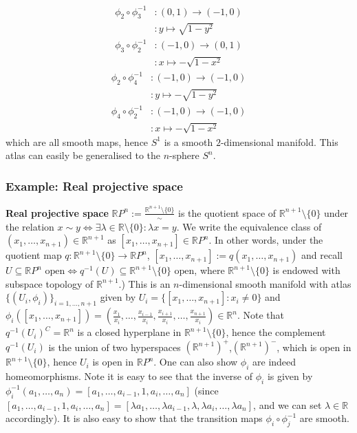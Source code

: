 \documentclass[a4paper]{article}
\theoremstyle{definition} \newtheorem*{definition}{Definition}
\theoremstyle{definition} \newtheorem*{definitions}{Definitions}
\theoremstyle{plain} \newtheorem{theorem}{Theorem}[section]
\theoremstyle{plain} \newtheorem{proposition}[theorem]{Proposition}
\theoremstyle{plain} \newtheorem{corollary}[theorem]{Corollary}
\theoremstyle{plain} \newtheorem{lemma}[theorem]{Lemma}
\theoremstyle{plain} \newtheorem{example}[theorem]{Example}
\newcommand{\defn}[1]{\textbf{#1}}
\newcommand{\realnos}{\mathbb{R}}
\begin{document}
\begin{align*}
\phi_2 \circ \phi_3^{-1} & : (0,1) \to (-1, 0) \\
& : y \mapsto \sqrt{1-y^2}
\end{align*}
\begin{align*}
\phi_3 \circ \phi_2^{-1} & : (-1,0) \to (0,1)\\
& : x \mapsto -\sqrt{1-x^2}
\end{align*}
\begin{align*}
\phi_2 \circ \phi_4^{-1} & : (-1,0) \to (-1,0)\\
& : y \mapsto -\sqrt{1-y^2}
\end{align*}
\begin{align*}
\phi_4 \circ \phi_2^{-1} & : (-1,0) \to (-1,0)\\
& : x \mapsto -\sqrt{1-x^2}
\end{align*}
which are all smooth maps, hence $S^1$ is a smooth $2$-dimensional manifold. This atlas can easily be generalised to the $n$-sphere $S^n$.

\subsubsection{Example: Real projective space}

\defn{Real projective space} $\realnos P^n := \frac{\realnos^{n+1}\setminus \{0\}}{\sim}$ is the quotient space of $\realnos^{n+1}\setminus \{0\}$ under the relation $x\sim y \iff \exists \lambda \in \realnos \setminus \{0\} : \lambda x=y$. We write the equivalence class of $(x_1, \ldots, x_{n+1})\in \realnos^{n+1}$ as $[x_1, \ldots, x_{n+1}]\in \realnos P^n$. 
In other words, under the quotient map $q:\realnos^{n+1}\setminus \{0\}\to \realnos P^n$, $[x_1, \ldots, x_{n+1}]:=q(x_1, \ldots, x_{n+1})$ and recall $U \subseteq \realnos P^n \textrm{ open} \iff q^{-1}(U) \subseteq \realnos^{n+1}\setminus \{0\} \textrm{ open}$, where $\realnos^{n+1}\setminus \{0\}$ is endowed with subspace topology of $\realnos^{n+1}$.) 
This is an $n$-dimensional smooth manifold with atlas $\{(U_i, \phi_i)\}_{i=1, \ldots, n+1}$ given by $U_i=\{[x_1, \ldots, x_{n+1}]: x_i\neq 0\}$ and $\phi_i([x_1, \ldots, x_{n+1}])=(\frac{x_1}{x_i}, \ldots , \frac{x_{i-1}}{x_i}, \frac{x_{i+1}}{x_i}, \ldots, \frac{x_{n+1}}{x_i})\in \realnos^n$. Note that $q^{-1}(U_i)^C=\realnos^n$ is a closed hyperplane in $\realnos^{n+1}\setminus \{0\}$, hence the complement $q^{-1}(U_i)$ is the union of two hyperspaces $(\realnos^{n+1})^+$,$(\realnos^{n+1})^-$, which is open in $\realnos^{n+1}\setminus \{0\}$, hence $U_i$ is open in $\realnos P^n$. One can also show $\phi_i$ are indeed homeomorphisms.  Note it is easy to see that the inverse of $\phi_i$ is given by $\phi_i^{-1}(a_1, \ldots, a_n)=[a_1, \ldots, a_{i-1}, 1, a_{i}, \ldots, a_n]$ (since $[a_1, \ldots, a_{i-1}, 1, a_{i}, \ldots, a_n]=[\lambda a_1, \ldots, \lambda a_{i-1}, \lambda, \lambda a_{i}, \ldots, \lambda a_n]$, and we can set $\lambda\in \realnos$ accordingly). It is also easy to show that the transition maps $\phi_i\circ \phi_j^{-1}$ are smooth. 
\end{document}

